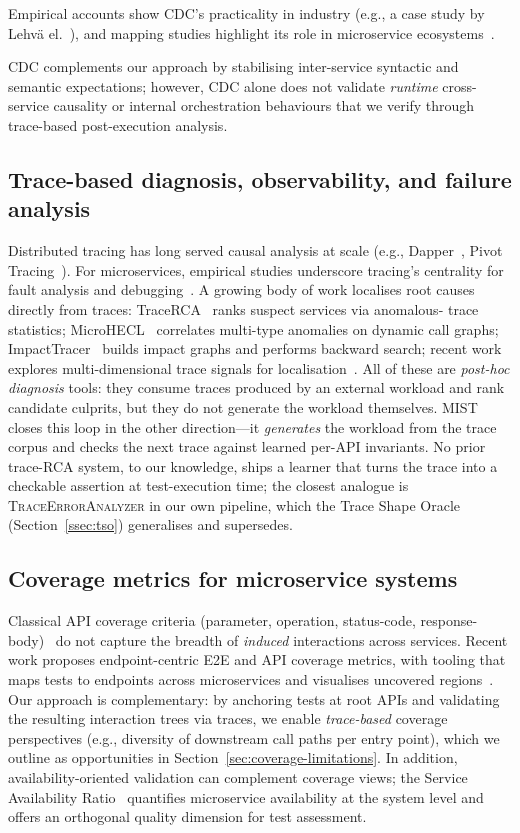 \documentclass[conference]{IEEEtran}
\begin{document}
Empirical accounts show CDC's practicality in industry (e.g., a case study by Lehv{\"a} el.~\cite{lehva2019cdc}), and mapping studies highlight its role in microservice ecosystems~\cite{waseem2020testing}. 

CDC complements our approach by stabilising inter-service syntactic and semantic expectations; however, CDC alone does not validate \emph{runtime} cross-service causality or internal orchestration behaviours that we verify through trace-based post-execution analysis.

\subsection{Trace-based diagnosis, observability, and failure analysis}
Distributed tracing has long served causal analysis at scale (e.g., Dapper~\cite{sigelman2010dapper}, Pivot Tracing~\cite{mace2015pivot}).
For microservices, empirical studies underscore tracing's centrality for fault analysis and debugging~\cite{zhou2018microservice}.
A growing body of work localises root causes directly from traces:
TraceRCA~\cite{li2021tracerca} ranks suspect services via anomalous-
trace statistics; MicroHECL~\cite{liu2021microhecl} correlates
multi-type anomalies on dynamic call graphs;
ImpactTracer~\cite{xie2023impacttracer} builds impact graphs and
performs backward search; recent work explores multi-dimensional trace
signals for localisation~\cite{zhang2024tracecontrast}.  All of these
are \emph{post-hoc diagnosis} tools: they consume traces produced by an
external workload and rank candidate culprits, but they do not generate
the workload themselves.  \textsc{MIST} closes this loop in the other
direction---it \emph{generates} the workload from the trace corpus and
checks the next trace against learned per-API invariants.  No prior
trace-RCA system, to our knowledge, ships a learner that turns the
trace into a checkable assertion at test-execution time; the closest
analogue is \textsc{TraceErrorAnalyzer} in our own pipeline, which the
Trace Shape Oracle (Section~\ref{ssec:tso}) generalises and supersedes.

\subsection{Coverage metrics for microservice systems}
Classical API coverage criteria (parameter, operation, status-code, response-body)~\cite{martin2019restest,arcuri2019restful} do not capture the breadth of \emph{induced} interactions across services. 
Recent work proposes endpoint-centric E2E and API coverage metrics, with tooling that maps tests to endpoints across microservices and visualises uncovered regions~\cite{abdelfattah2024coverage}. 
Our approach is complementary: by anchoring tests at root APIs and validating the resulting interaction trees via traces, we enable \emph{trace-based} coverage perspectives (e.g., diversity of downstream call paths per entry point), which we outline as opportunities in Section~\ref{sec:coverage-limitations}. In addition, availability-oriented validation can complement coverage views; the Service Availability Ratio~\cite{sar} quantifies microservice availability at the system level and offers an orthogonal quality dimension for test assessment.
\end{document}
